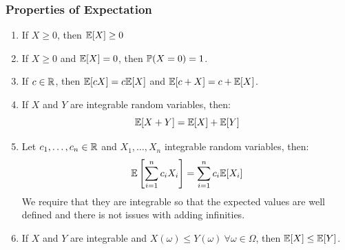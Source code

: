 \documentclass[../main.tex]{subfiles}
\begin{document}
\subsubsection{Properties of Expectation}
\begin{proposition}
\begin{enumerate} \label{expectationProperties}
  \item If $X \geq 0$, then $\E[X] \geq 0$
  \item If $X \geq 0$ and $\E[X] = 0$, then $\P(X = 0) = 1$.
  \item If $c \in \R$, then $\E[cX] = c\E[X]$ and $\E[c + X] = c + \E[X]$.
  \item If $X$ and $Y$ are integrable random variables, then:
    \[
      \E[X + Y] = \E[X] + \E[Y]
    \]
  \item Let $c_1, \ldots, c_n \in \R$ and $X_1, \ldots, X_n$ integrable random variables, then:
    \[
      \E\left[\sum_{i = 1}^{n} c_i X_i\right] = \sum_{i = 1}^{n} c_i \E[X_i]
    \]
    We require that they are integrable so that the expected values are well defined and there is not issues with adding infinities.
  \item If $X$ and $Y$ are integrable and $X(\omega) \leq Y(\omega)\ \forall \omega \in \Omega$, then $\E[X] \leq \E[Y]$.
\end{enumerate}
\end{proposition}
\end{document}
